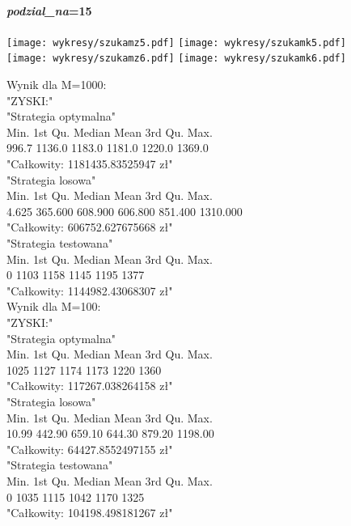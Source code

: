 \documentclass{article}
\begin{document}
\paragraph{\textit{podzial\_na}=15}
\begin{center}
\texttt{[image: wykresy/szukamz5.pdf]}
\texttt{[image: wykresy/szukamk5.pdf]}
\\
\texttt{[image: wykresy/szukamz6.pdf]}
\texttt{[image: wykresy/szukamk6.pdf]}
\end{center}

Wynik dla M=1000:\\

"ZYSKI:" \\
"Strategia optymalna" \\
Min. 1st Qu.  Median    Mean 3rd Qu.    Max.  \\
996.7  1136.0  1183.0  1181.0  1220.0  1369.0 \\ 
"Całkowity:  1181435.83525947 zł" \\
"Strategia losowa" \\
Min.  1st Qu.   Median     Mean  3rd Qu.     Max.  \\
4.625  365.600  608.900  606.800  851.400 1310.000  \\
"Całkowity:  606752.627675668 zł" \\
"Strategia testowana" \\
Min. 1st Qu.  Median    Mean 3rd Qu.    Max.  \\
0    1103    1158    1145    1195    1377 \\ 
"Całkowity:  1144982.43068307 zł" \\

Wynik dla M=100:\\
"ZYSKI:" \\
"Strategia optymalna" \\
Min. 1st Qu.  Median    Mean 3rd Qu.    Max.  \\
1025    1127    1174    1173    1220    1360 \\ 
"Całkowity:  117267.038264158 zł" \\
"Strategia losowa" \\
Min. 1st Qu.  Median    Mean 3rd Qu.    Max.  \\
10.99  442.90  659.10  644.30  879.20 1198.00 \\ 
"Całkowity:  64427.8552497155 zł" \\
"Strategia testowana" \\
Min. 1st Qu.  Median    Mean 3rd Qu.    Max.  \\
0    1035    1115    1042    1170    1325 \\ 
"Całkowity:  104198.498181267 zł" \\
\end{document}
